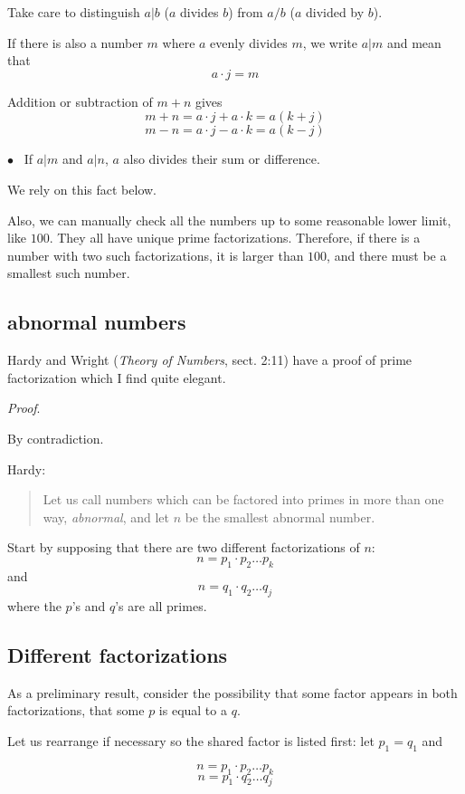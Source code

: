 \documentclass[11pt, oneside]{article}
\begin{document}
Take care to distinguish $a|b$ ($a$ divides $b$) from $a/b$ ($a$ divided by $b$).

If there is also a number $m$ where $a$ evenly divides $m$, we write $a|m$ and mean that
\[ a \cdot j = m \]

Addition or subtraction of $m + n$ gives
\[ m + n = a \cdot j + a \cdot k = a(k + j) \]
\[ m - n = a \cdot j - a \cdot k = a(k - j) \]

$\bullet$ \ If $a|m$ and $a|n$, $a$ also divides their sum or difference.

We rely on this fact below.

Also, we can manually check all the numbers up to some reasonable lower limit, like $100$.  They all have unique prime factorizations.  Therefore, if there is a number with two such factorizations, it is larger than $100$, and there must be a smallest such number.

\subsection*{abnormal numbers}

Hardy and Wright (\emph{Theory of Numbers}, sect. 2:11) have a proof of prime factorization which I find quite elegant.

\emph{Proof}.

By contradiction.

Hardy:
\begin{quote}Let us call numbers which can be factored into primes in more than one way, \emph{abnormal}, and let $n$ be the smallest abnormal number.\end{quote}

Start by supposing that there are two different factorizations of $n$:
\[ n = p_1 \cdot p_2 \dots p_k \]
and
\[ n = q_1 \cdot q_2 \dots q_j \]
where the $p$'s and $q$'s are all primes.

\subsection*{Different factorizations}

As a preliminary result, consider the possibility that some factor appears in both factorizations, that some $p$ is equal to a $q$.

Let us rearrange if necessary so the shared factor is listed first:  let $p_1 = q_1$ and

\[ n = p_1 \cdot p_2 \dots p_k \]
\[ n = p_1 \cdot q_2 \dots q_j \]
\end{document}
